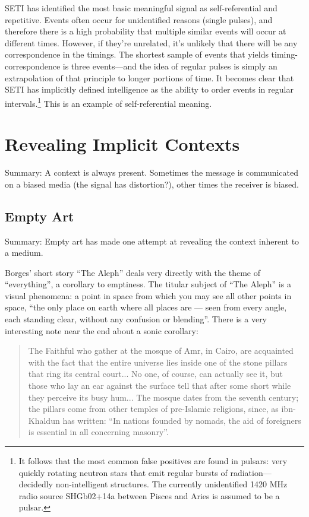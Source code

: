 \documentclass{thesis}
\begin{document}
SETI has identified the most basic meaningful signal as self-referential and repetitive. Events often occur for unidentified reasons (single pulses), and therefore there is a high probability that multiple similar events will occur at different times. However, if they're unrelated, it's unlikely that there will be any correspondence in the timings. The shortest sample of events that yields timing-correspondence is three events---and the idea of regular pulses is simply an extrapolation of that principle to longer portions of time. It becomes clear that SETI has implicitly defined intelligence as the ability to order events in regular intervals.\footnote{It follows that the most common false positives are found in pulsars: very quickly rotating neutron stars that emit regular bursts of radiation---decidedly non-intelligent structures. The currently unidentified 1420 MHz radio source SHGb02+14a between Pisces and Aries is assumed to be a pulsar.\cite{eugenie_samuel_reich_mysterious_2004}} This is an example of self-referential meaning.
	
\chapter{Revealing Implicit Contexts}
	
	Summary: A context is always present. Sometimes the message is communicated on a biased media (the signal has distortion?), other times the receiver is biased.

\section{Empty Art}

	Summary: Empty art has made one attempt at revealing the context inherent to a medium.

	Borges' short story ``The Aleph''\cite{borges_aleph_2004} deals very directly with the theme of ``everything'', a corollary to emptiness. The titular subject of ``The Aleph'' is a visual phenomena: a point in space from which you may see all other points in space, ``the only place on earth where all places are --- seen from every angle, each standing clear, without any confusion or blending''. There is a very interesting note near the end about a sonic corollary:
	
	\begin{quote}
	The Faithful who gather at the mosque of Amr, in Cairo, are acquainted with the fact that the entire universe lies inside one of the stone pillars that ring its central court... No one, of course, can actually see it, but those who lay an ear against the surface tell that after some short while they perceive its busy hum... The mosque dates from the seventh century; the pillars come from other temples of pre-Islamic religions, since, as ibn-Khaldun has written: ``In nations founded by nomads, the aid of foreigners is essential in all concerning masonry''.
	\end{quote}
	
\end{document}
